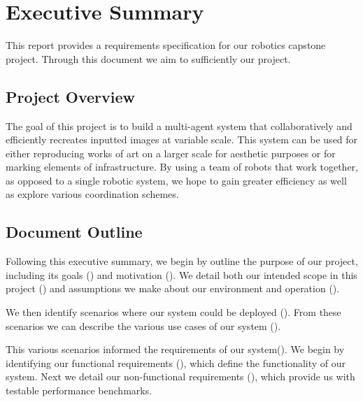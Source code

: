 
\section {Executive Summary}
\label{sec:executive_summary}
This report provides a requirements specification for our robotics capstone project. Through this document we aim to sufficiently   our project. 

\subsection{Project Overview}
The goal of this project is to build a multi-agent system that collaboratively and efficiently recreates inputted images at variable scale. 
This system can be used for either reproducing works of art on a larger scale for aesthetic purposes or for marking elements of infrastructure. 
By using a team of robots that work together, as opposed to a single robotic system, we hope to gain greater efficiency as well as explore various coordination schemes. 


\subsection{Document Outline}
Following this executive summary, we begin by outline the purpose of our project, including its goals () and motivation (). 
We detail both our intended scope in this project () and assumptions we make about our environment and operation (). 

We then identify scenarios where our system could be deployed (). 
From these scenarios we can describe the various use cases of our system ().

This various scenarios informed the requirements of our system(). 
We begin by identifying our functional requirements (), which define the functionality of our system. 
Next we detail our non-functional requirements (), which provide us with testable performance benchmarks.

